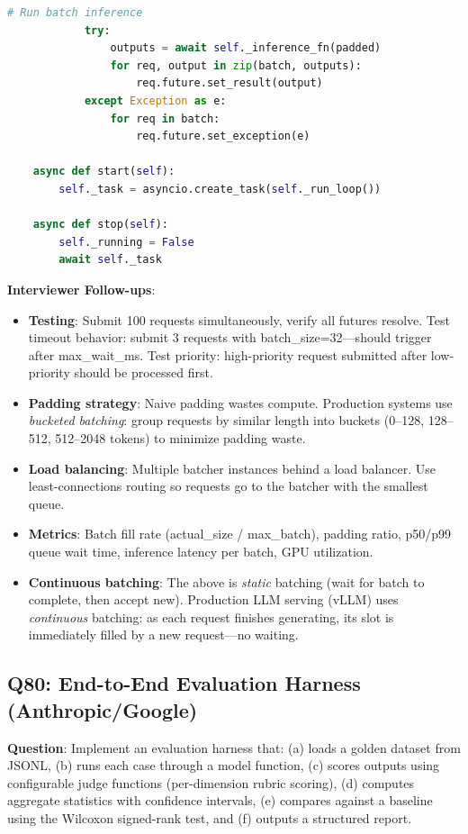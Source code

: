 \begin{lstlisting}[language=Python]
            # Run batch inference
            try:
                outputs = await self._inference_fn(padded)
                for req, output in zip(batch, outputs):
                    req.future.set_result(output)
            except Exception as e:
                for req in batch:
                    req.future.set_exception(e)

    async def start(self):
        self._task = asyncio.create_task(self._run_loop())

    async def stop(self):
        self._running = False
        await self._task
\end{lstlisting}

\textbf{Interviewer Follow-ups}:
\begin{itemize}[leftmargin=*]
    \item \textbf{Testing}: Submit 100 requests simultaneously, verify all futures resolve. Test timeout behavior: submit 3 requests with batch\_size=32---should trigger after max\_wait\_ms. Test priority: high-priority request submitted after low-priority should be processed first.
    \item \textbf{Padding strategy}: Naive padding wastes compute. Production systems use \emph{bucketed batching}: group requests by similar length into buckets (0--128, 128--512, 512--2048 tokens) to minimize padding waste.
    \item \textbf{Load balancing}: Multiple batcher instances behind a load balancer. Use least-connections routing so requests go to the batcher with the smallest queue.
    \item \textbf{Metrics}: Batch fill rate (actual\_size / max\_batch), padding ratio, p50/p99 queue wait time, inference latency per batch, GPU utilization.
    \item \textbf{Continuous batching}: The above is \emph{static} batching (wait for batch to complete, then accept new). Production LLM serving (vLLM) uses \emph{continuous} batching: as each request finishes generating, its slot is immediately filled by a new request---no waiting.
\end{itemize}

\subsection{Q80: End-to-End Evaluation Harness (Anthropic/Google)}

\textbf{Question}: Implement an evaluation harness that: (a) loads a golden dataset from JSONL, (b) runs each case through a model function, (c) scores outputs using configurable judge functions (per-dimension rubric scoring), (d) computes aggregate statistics with confidence intervals, (e) compares against a baseline using the Wilcoxon signed-rank test, and (f) outputs a structured report.

